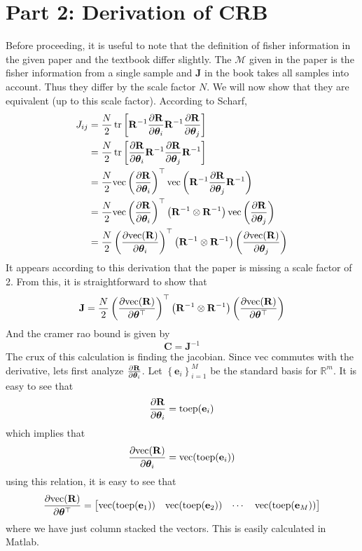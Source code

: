 \documentclass[a4paper]{article}
\begin{document}
  \section*{Part 2: Derivation of CRB}%
  Before proceeding, it is useful to note that the definition of fisher information in the given paper and the textbook differ slightly. The $\mathcal{M}$ given in the paper is the fisher information from a single sample and $\mathbf{J}$ in the book takes all samples into account. Thus they differ by the scale factor $N$. We will now show that they are equivalent (up to this scale factor). According to Scharf,
  \[
    \begin{aligned}
      J_{ij} &= \frac{N}{2} \tr \left[ \mathbf{R}^{-1} \pdv{\mathbf{R}}{\bm{\theta}_i}  \mathbf{R}^{-1} \pdv{\mathbf{R}}{\bm{\theta}_j}\right] \\
             &= \frac{N}{2} \tr \left[\pdv{\mathbf{R}}{\bm{\theta}_i}  \mathbf{R}^{-1} \pdv{\mathbf{R}}{\bm{\theta}_j} \mathbf{R}^{-1}\right] \\
             &= \frac{N}{2} \text{vec} \left( \pdv{\mathbf{R}}{\bm{\theta}_i} \right)^\top \text{vec} \left( \mathbf{R}^{-1} \pdv{\mathbf{R}}{\bm{\theta}_j} \mathbf{R}^{-1} \right) \\
             &= \frac{N}{2} \text{vec} \left( \pdv{\mathbf{R}}{\bm{\theta}_i} \right)^\top \left( \mathbf{R}^{-1} \otimes \mathbf{R}^{-1} \right) \text{vec} \left( \pdv{\mathbf{R}}{\bm{\theta}_j}\right) \\
             &=\frac{N}{2} \left( \pdv{\text{vec}(\mathbf{R})}{\bm{\theta}_i} \right)^\top \left( \mathbf{R}^{-1} \otimes \mathbf{R}^{-1} \right) \left( \pdv{\text{vec}(\mathbf{R})}{\bm{\theta}_j}\right) \\
    \end{aligned}
  \]
  It appears according to this derivation that the paper is missing a scale factor of 2. From this, it is straightforward to show that
  \[
    \mathbf{J} = \frac{N}{2}  \left( \pdv{\text{vec}(\mathbf{R})}{\bm{\theta}^\top} \right)^\top \left(\mathbf{R}^{-1} \otimes \mathbf{R}^{-1} \right) \left( \pdv{\text{vec}(\mathbf{R})}{\bm{\theta}^\top} \right)
  \]
  And the cramer rao bound is given by
  \[
    \mathbf{C} = \mathbf{J}^{-1}
  \]
  The crux of this calculation is finding the jacobian. Since $\text{vec}$ commutes with the derivative, lets first analyze $\pdv{\mathbf{R}}{\bm{\theta}_i}$. Let $\left\{\mathbf{e}_i\right\}_{i=1}^M$ be the standard basis for $\mathds{R}^m$. It is easy to see that
  \[
    \pdv{\mathbf{R}}{\bm{\theta}_i} = \text{toep}(\mathbf{e}_i)
  \]
  which implies that
  \[
    \pdv{\text{vec}(\mathbf{R})}{\bm{\theta}_i} = \text{vec}(\text{toep}(\mathbf{e}_i))
  \]
  using this relation, it is easy to see that
  \[
    \pdv{\text{vec}(\mathbf{R})}{\bm{\theta}^\top} = 
    \begin{bmatrix}
      \text{vec}(\text{toep}(\mathbf{e}_1)) &  \text{vec}(\text{toep}(\mathbf{e}_2)) & \cdots & \text{vec}(\text{toep}(\mathbf{e}_M)) 
    \end{bmatrix}
  \]
  where we have just column stacked the vectors. This is easily calculated in Matlab.
\end{document}
